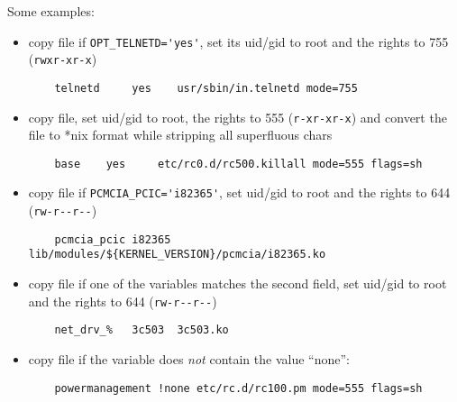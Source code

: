     Some examples:
    \begin{itemize}
    \item copy file if \verb+OPT_TELNETD='yes'+, set its
uid/gid to root and the rights to 755 (\verb?rwxr-xr-x?)

\begin{example}
\begin{verbatim}
    telnetd     yes    usr/sbin/in.telnetd mode=755
\end{verbatim}
\end{example}

    \item copy file, set
uid/gid to root, the rights to 555 (\verb?r-xr-xr-x?) and convert the
file to *nix format while stripping all superfluous chars

\begin{example}
\begin{verbatim}
    base    yes     etc/rc0.d/rc500.killall mode=555 flags=sh
\end{verbatim}
\end{example}

         \item copy file if \verb+PCMCIA_PCIC='i82365'+, set
uid/gid to root and the rights to 644 (\verb?rw-r--r--?)

\begin{example}
\begin{verbatim}
    pcmcia_pcic i82365 lib/modules/${KERNEL_VERSION}/pcmcia/i82365.ko
\end{verbatim}
\end{example}

         \item copy file if one of the  variables matches the second field,
set uid/gid to root and the rights to 644 (\verb?rw-r--r--?)

\begin{example}
\begin{verbatim}
    net_drv_%   3c503  3c503.ko
\end{verbatim}
\end{example}

        \item copy file if the variable  does \emph{not}
        contain the value ``none'':

        \begin{example}
\begin{verbatim}
    powermanagement !none etc/rc.d/rc100.pm mode=555 flags=sh
\end{verbatim}
\end{example}


\end{itemize}
